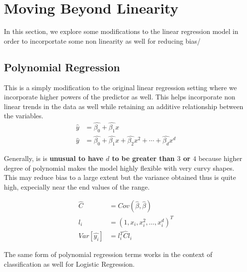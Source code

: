 \documentclass[11pt, a4paper]{article}
\begin{document}
    \section{Moving Beyond Linearity}
    In this section, we explore some modifications to the linear regression model in order to incorportate some non linearity as well for reducing bias/

    \subsection{Polynomial Regression}
    This is a simply modification to the original linear regression setting where we incorporate higher powers of the predictor as well. This helps incorporate non linear trends in the data as well while retaining an additive relationship between the variables.
    \begin{align*}
        \hat{y} &= \hat{\beta_{0}} + \hat{\beta_{1}}x \tag*{Linear Regression}\\
        \hat{y} &= \hat{\beta_{0}} + \hat{\beta_{1}}x + \hat{\beta_{2}}x^{2} + \cdots + \hat{\beta_{d}}x^{d} \tag*{Polynomial Regression}
    \end{align*}

    Generally, is is \textbf{unusual to have $d$ to be greater than $3$ or $4$} because higher degree of polynomial makes the model highly flexible with very curvy shapes. This may reduce bias to a large extent but the variance obtained thus is quite high, expecially near the end values of the range.

    \begin{align*}
        \hat{C} &= Cov(\hat{\beta}, \hat{\beta})\\
        l_{i} &= (1, x_{i}, x_{i}^{2}, \ldots, x_{i}^{d})^{T}\\
        Var[\hat{y_{i}}] &= l_{i}^{T}\hat{C}l_{i}
    \end{align*}

    The same form of polynomial regression terms works in the context of classification as well for Logistic Regression.

    
\end{document}
